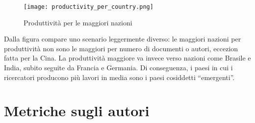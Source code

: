 \begin{figure}[tb]
  \centering
  \texttt{[image: productivity\_per\_country.png]}
  \caption{Produttività per le maggiori nazioni}
  \label{fig:productivity-per-country}
\end{figure}

Dalla figura compare uno scenario leggermente diverso: le maggiori nazioni
per produttività non sono le maggiori per numero di documenti o autori, eccezion
fatta per la Cina. La produttività maggiore va invece verso nazioni come Brasile
e India, subito seguite da Francia e Germania.
Di conseguenza, i paesi in cui i ricercatori producono più lavori in media
sono i paesi cosiddetti ``emergenti''.

\section{Metriche sugli autori}




